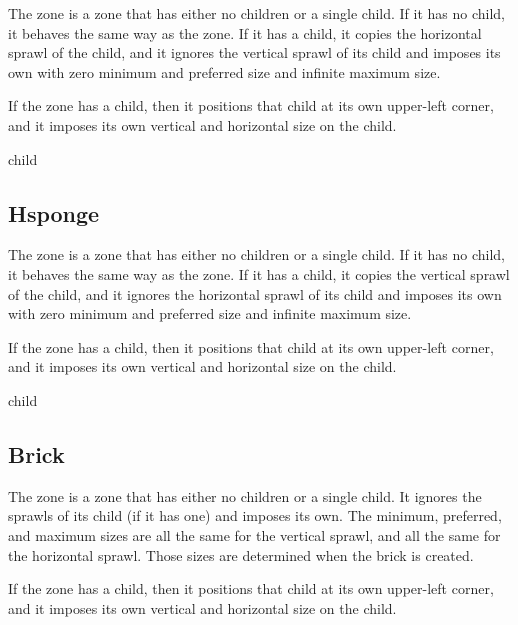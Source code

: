 The  zone is a zone that has either no children or a
single child.  If it has no child, it behaves the same way as the
 zone.   If it has a
child, it copies the horizontal sprawl of the child, and it ignores
the vertical sprawl of its child and imposes its own with zero minimum
and preferred size and infinite maximum size.

If the  zone has a child, then it positions that child
at its own upper-left corner, and it imposes its own vertical and
horizontal size on the child.


 {\optional child}

\subsection{Hsponge}
\label{sec-zones-layout-hsponge}

The  zone is a zone that has either no children or a single
child.  If it has no child, it behaves the same way as the
 zone.   If it has a
child, it copies the vertical sprawl of the child, and it ignores
the horizontal sprawl of its child and imposes its own with zero minimum
and preferred size and infinite maximum size.

If the  zone has a child, then it positions that child
at its own upper-left corner, and it imposes its own vertical and
horizontal size on the child.


 {\optional child}

\subsection{Brick}
\label{sec-zones-layout-brick}

The  zone is a zone that has either no children or a
single child.  It ignores the sprawls of its child (if it has one) and
imposes its own.  The minimum, preferred, and maximum sizes are all
the same for the vertical sprawl, and all the same for the horizontal
sprawl.  Those sizes are determined when the brick is created.

If the  zone has a child, then it positions that child at
its own upper-left corner, and it imposes its own vertical and
horizontal size on the child.

